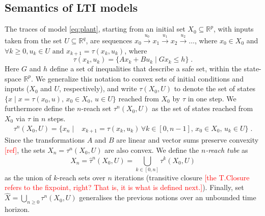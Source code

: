 \documentclass[sigconf]{llncs}
\newcommand{\mat}[1]{{#1}}
\renewcommand{\vec}[1]{{#1}}
\renewcommand{\note}[1]{\textcolor{red}{[#1]}}
\begin{document}
\subsection{Semantics of LTI models}\label{sec:model_semantics}
%
The traces of model \eqref{eq:plant}, 
starting from an initial set $X_0\subseteq \mathbb{R}^p$, 
with inputs taken from the set $U \subseteq \mathbb{R}^q$, are sequences 
$ \vec{x}_0 \xrightarrow{\vec{u}_0} \vec{x}_1 \xrightarrow{\vec{u}_1} \vec{x}_2 \xrightarrow{\vec{u}_2} \ldots $, 
%
where $ \vec{x}_0 \in X_0$ and $\forall k\geq 0, \vec{u}_k \in U \text{ and } \vec{x}_{k+1} = \tau(\vec{x}_k,\vec{u}_k) $, 
where 
%
\begin{equation}\label{equ:reachtraj}
\tau(\vec{x}_k,\vec{u}_k) = 
\big\{ \mat{A}\vec{x}_k +
\mat{B}\vec{u}_k \mid \mat{G}\vec{x}_k \leq \vec{h}\big\}\;. 
\end{equation}
%
Here $\mat{G}$ and $\vec{h}$ define a set of inequalities that describe a safe set, within the state-space $\mathbb{R}^p$.
%
We generalize this notation to convex sets of initial conditions and inputs ($X_0$ and $U$, respectively), 
and write $\tau(X_0,U)$ to denote the set of states $\{\vec{x} \mid \vec{x} = \tau(\vec{x}_0,\vec{u}),\, \vec{x}_0 \in
X_0,\, \vec{u} \in U \}$
reached from $X_0$ by $\tau$ in one step. 
%
We furthermore define the $n$-reach set $\tau^n(X_0,U)$ as the set of states reached from
$X_0$ via $\tau$ in $n$ steps.
%
\begin{align}\label{equ:reachset}
\tau^n(X_0,U) = \{\vec{x}_n \mid & 
\vec{x}_{k+1}=\tau(\vec{x}_{k},\vec{u}_{k}) \, \forall k\in [0,n-1], \,
\vec{x}_0 \in X_0, \,
\vec{u}_{k} \in U  \} \;. 
\end{align}
%
Since the transformations $\mat{A}$ and $\mat{B}$ are linear and vector sums preserve convexity \note{ref}, 
the sets $X_n = \tau^n(X_0,U)$ are also convex.  
We define the \emph{$n$-reach tube} as 
\begin{equation}\label{equ:reachtube}
\hat{X}_n=\hat{\tau}^n(X_0,U)=\bigcup_{k\in[0,n]} \tau^k(X_0,U)
\end{equation}
as the union of $k$-reach sets over $n$ iterations (transitive closure \note{the T.Closure refers to the fixpoint, right? That is, it is what is defined next.}). 
%
Finally, set $\hat{X} =\bigcup_{n\geq 0} \tau^n(X_0,U)$ 
generalises the previous notions over an unbounded time horizon.

\end{document}
